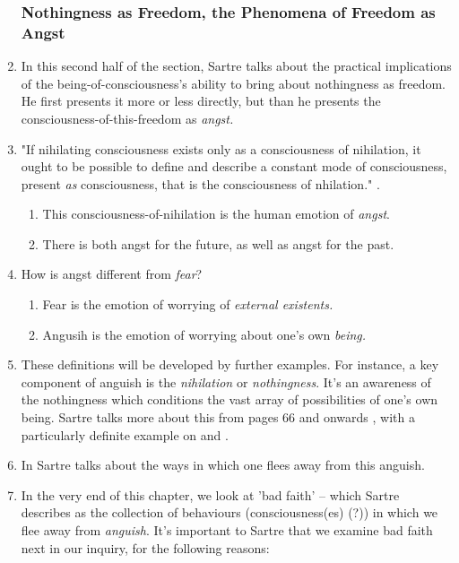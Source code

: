 \begin{enumerate}
  \subsubsection*{Nothingness as Freedom, the Phenomena of Freedom as Angst}
  \item In this second half of the section, Sartre talks about the practical implications of the being-of-consciousness's ability to bring about nothingness as freedom. He first presents it more or less directly, but than he presents the consciousness-of-this-freedom as \emph{angst.}
  \item "If nihilating consciousness exists only as a consciousness of nihilation, it ought to be possible to define and describe a constant mode of consciousness, present \emph{as} consciousness, that is the consciousness of nhilation." \autocite[66]{sartre}.
  \begin{enumerate}
    \item This consciousness-of-nihilation is the human emotion of \emph{angst}.
    \item There is both angst for the future, as well as angst for the past.
  \end{enumerate}
  \item How is angst different from \emph{fear}?
  \begin{enumerate}
    \item Fear is the emotion of worrying of \emph{external existents.}
    \item Angusih is the emotion of worrying about one's own \emph{being.}
  \end{enumerate}
  \item These definitions will be developed by further examples. For instance, a key component of anguish is the \emph{nihilation} or \emph{nothingness}. It's an awareness of the nothingness which conditions the vast array of possibilities of one's own being. Sartre talks more about this from pages 66 and onwards \autocite[66]{sartre}, with a particularly definite example on \autocite[71]{sartre} and \autocite[77]{sartre}.
  \item In \autocite[80]{sartre} Sartre talks about the ways in which one flees away from this anguish.
  \item In the very end of this chapter, we look at 'bad faith' -- which Sartre describes as the collection of behaviours (consciousness(es) (?)) in which we flee away from \emph{anguish}. It's important to Sartre that we examine bad faith next in our inquiry, for the following reasons:
  \begin{enumerate}

\end{enumerate}
\end{enumerate}
